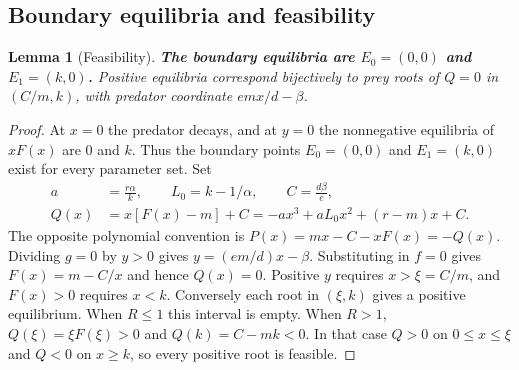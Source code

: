 \documentclass[12pt,a4paper,twoside,fleqn]{article}
\theoremstyle{journal}
\newtheorem{lemma}{Lemma}
\newcommand{\claim}[1]{{\normalfont\bfseries\boldmath #1}}
\begin{document}
\subsection{Boundary equilibria and feasibility}
\begin{lemma}[Feasibility]\label{lem:feas}
\claim{The boundary equilibria are \(E_0=(0,0)\) and \(E_1=(k,0)\).} Positive equilibria correspond bijectively to prey roots of \(Q=0\) in \((C/m,k)\), with predator coordinate \(emx/d-\beta\).
\end{lemma}
\begin{proof}
At \(x=0\) the predator decays, and at \(y=0\) the nonnegative equilibria of \(xF(x)\) are \(0\) and \(k\). Thus the boundary points \(E_0=(0,0)\) and \(E_1=(k,0)\) exist for every parameter set. Set
\begin{equation}\label{eq:Q}
 \begin{aligned}
 a&=\frac{r\alpha}{k},\qquad L_0=k-1/\alpha,\qquad C=\frac{d\beta}{e},\\
 Q(x)&=x[F(x)-m]+C=-ax^3+aL_0x^2+(r-m)x+C .
 \end{aligned}
\end{equation}
The opposite polynomial convention is \(P(x)=mx-C-xF(x)=-Q(x)\). Dividing \(g=0\) by \(y>0\) gives \(y=(em/d)x-\beta\). Substituting in \(f=0\) gives \(F(x)=m-C/x\) and hence \(Q(x)=0\). Positive \(y\) requires \(x>\xi=C/m\), and \(F(x)>0\) requires \(x<k\). Conversely each root in \((\xi,k)\) gives a positive equilibrium. When \(R\le1\) this interval is empty. When \(R>1\), \(Q(\xi)=\xi F(\xi)>0\) and \(Q(k)=C-mk<0\). In that case \(Q>0\) on \(0\le x\le\xi\) and \(Q<0\) on \(x\ge k\), so every positive root is feasible.

\end{proof}
\end{document}
